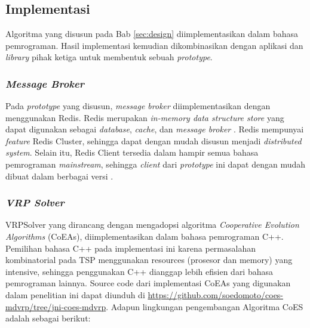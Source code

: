 \chapter{\babLima}


\section{Implementasi}
\label{sec:implementation}
Algoritma yang disusun pada Bab \ref{sec:design} diimplementasikan dalam bahasa pemrograman. Hasil implementasi kemudian dikombinasikan dengan aplikasi dan \textit{library} pihak ketiga untuk membentuk sebuah \textit{prototype}.


\subsection{\textit{Message Broker}}
Pada \textit{prototype} yang disusun, \textit{message broker} diimplementasikan dengan menggunakan Redis. Redis merupakan \textit{in-memory data structure store} yang dapat digunakan sebagai \textit{database}, \textit{cache}, dan \textit{message broker} \citep{redis_introduction_2017}. Redis mempunyai \textit{feature} Redis Cluster, sehingga dapat dengan mudah disusun menjadi \textit{distributed system}. Selain itu, Redis Client tersedia dalam hampir semua bahasa pemrograman \textit{mainstream}, sehingga \textit{client} dari \textit{prototype} ini dapat dengan mudah dibuat dalam berbagai versi \citep{redis_clients_2017}.


\subsection{\textit{VRP Solver}}
VRPSolver yang dirancang dengan mengadopsi algoritma \textit{Cooperative Evolution Algorithms} (CoEAs), diimplementasikan dalam bahasa pemrograman C++. Pemilihan bahasa C++ pada implementasi ini karena permasalahan kombinatorial pada TSP menggunakan resources (prosesor dan memory) yang intensive, sehingga penggunakan C++ dianggap lebih efisien dari bahasa pemrograman lainnya. Source code dari implementasi CoEAs yang digunakan dalam penelitian ini dapat diunduh di \url{https://github.com/soedomoto/coes-mdvrp/tree/jni-coes-mdvrp}. Adapun lingkungan pengembangan Algoritma CoES adalah sebagai berikut:


